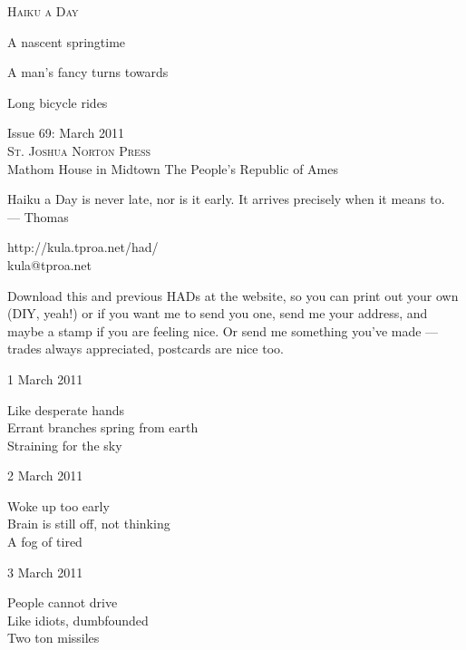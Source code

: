 \documentclass[12pt]{article}
\begin{document}
\begin{center}
{\fontsize{36}{48}\selectfont \textsc{Haiku a Day }}
\end{center}

\vspace*{3.5cm}

{\fontsize{20}{40}\selectfont 

A nascent springtime

A man's fancy turns towards

Long bicycle rides


}

\vspace*{5.0cm}
\begin{center}
{\large{Issue 69: March 2011}} \\[5mm]
{\fontsize{8}{8}\selectfont  \textsc{ St. Joshua Norton Press }} \\[1mm]
{\fontsize{6}{6}\selectfont Mathom House in Midtown \textbar The People's Republic of Ames }
\end{center}


\newpage

Haiku a Day is never late, nor is it early. It arrives precisely when it means to.  \\
--- Thomas

http://kula.tproa.net/had/ \\
kula@tproa.net

Download this and previous HADs at the website, so you can
print out your own (DIY, yeah!) or if you want me to send
you one, send me your address, and maybe a stamp if you
are feeling nice. Or send me something you've made ---
trades always appreciated, postcards are nice too.

\vfill

1 March 2011

Like desperate hands \\
Errant branches spring from earth \\
Straining for the sky

2 March 2011

Woke up too early \\
Brain is still off, not thinking \\
A fog of tired

3 March 2011

People cannot drive \\
Like idiots, dumbfounded \\
Two ton missiles

\newpage
\end{document}
